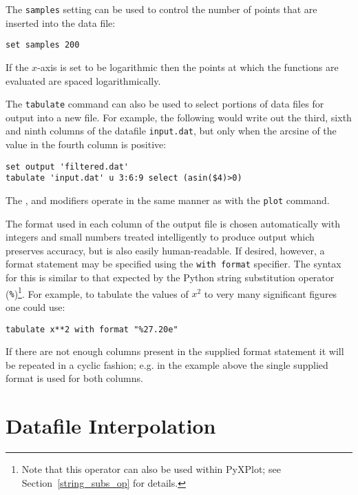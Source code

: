 The {\tt samples} setting can be used to control the number of points that are
inserted into the data file:

\begin{verbatim}
set samples 200
\end{verbatim}

\noindent If the $x$-axis is set to be logarithmic then the points at which the
functions are evaluated are spaced logarithmically.

The {\tt tabulate} command can also be used to select portions of data files
for output into a new file.  For example, the following would write out the
third, sixth and ninth columns of the datafile {\tt input.dat}, but only when
the arcsine of the value in the fourth column is positive:

\begin{verbatim}
set output 'filtered.dat'
tabulate 'input.dat' u 3:6:9 select (asin($4)>0)
\end{verbatim}

\noindent The ,  and  modifiers
operate in the same manner as with the {\tt plot} command.

The format used in each column of the output file is chosen automatically with
integers and small numbers treated intelligently to produce output which
preserves accuracy, but is also easily human-readable. If desired, however, a
format statement may be specified using the {\tt with format} specifier. The
syntax for this is similar to that expected by the Python string substitution
operator ({\tt \%})\footnote{Note that this operator can also be used
within PyXPlot; see Section~\ref{string_subs_op} for details.}.  For example,
to tabulate the values of $x^2$ to very many significant figures one could use:

\begin{verbatim}
tabulate x**2 with format "%27.20e"
\end{verbatim}

If there are not enough columns present in the supplied format statement it
will be repeated in a cyclic fashion; e.g. in the example above the single
supplied format is used for both columns.

\section{Datafile Interpolation}
\label{spline_command}

